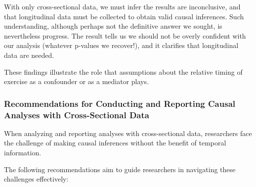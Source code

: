 \documentclass[
  singlecolumn]{article}
\begin{document}
With only cross-sectional data, we must infer the results are
inconclusive, and that longitudinal data must be collected to obtain
valid causal inferences. Such understanding, although perhaps not the
definitive answer we sought, is nevertheless progress. The result tells
us we should not be overly confident with our analysis (whatever
p-values we recover!), and it clarifies that longitudinal data are
needed.

These findings illustrate the role that assumptions about the relative
timing of exercise as a confounder or as a mediator plays.

\subsubsection{Recommendations for Conducting and Reporting Causal
Analyses with Cross-Sectional
Data}\label{recommendations-for-conducting-and-reporting-causal-analyses-with-cross-sectional-data}

When analyzing and reporting analyses with cross-sectional data,
researchers face the challenge of making causal inferences without the
benefit of temporal information.

The following recommendations aim to guide researchers in navigating
these challenges effectively:
\end{document}

